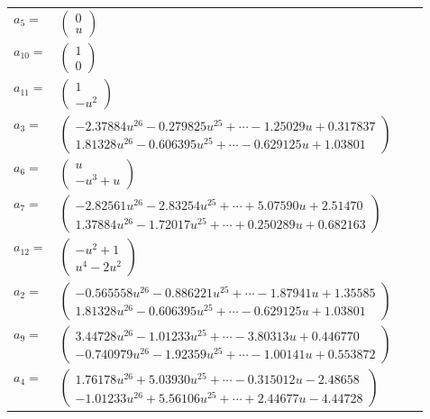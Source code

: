 \documentclass[1p]{elsarticle_modified}
\theoremstyle{definition}
\begin{document}
\begin{tabular}{m{7pt} m{180pt} m{7pt} m{180pt} }
\flushright $a_{5}=$&$\begin{pmatrix}0\\u\end{pmatrix}$ \\
\flushright $a_{10}=$&$\begin{pmatrix}1\\0\end{pmatrix}$ \\
\flushright $a_{11}=$&$\begin{pmatrix}1\\- u^2\end{pmatrix}$ \\
\flushright $a_{3}=$&$\begin{pmatrix}-2.37884 u^{26}-0.279825 u^{25}+\cdots-1.25029 u+0.317837\\1.81328 u^{26}-0.606395 u^{25}+\cdots-0.629125 u+1.03801\end{pmatrix}$ \\
\flushright $a_{6}=$&$\begin{pmatrix}u\\- u^3+u\end{pmatrix}$ \\
\flushright $a_{7}=$&$\begin{pmatrix}-2.82561 u^{26}-2.83254 u^{25}+\cdots+5.07590 u+2.51470\\1.37884 u^{26}-1.72017 u^{25}+\cdots+0.250289 u+0.682163\end{pmatrix}$ \\
\flushright $a_{12}=$&$\begin{pmatrix}- u^2+1\\u^4-2 u^2\end{pmatrix}$ \\
\flushright $a_{2}=$&$\begin{pmatrix}-0.565558 u^{26}-0.886221 u^{25}+\cdots-1.87941 u+1.35585\\1.81328 u^{26}-0.606395 u^{25}+\cdots-0.629125 u+1.03801\end{pmatrix}$ \\
\flushright $a_{9}=$&$\begin{pmatrix}3.44728 u^{26}-1.01233 u^{25}+\cdots-3.80313 u+0.446770\\-0.740979 u^{26}-1.92359 u^{25}+\cdots-1.00141 u+0.553872\end{pmatrix}$ \\
\flushright $a_{4}=$&$\begin{pmatrix}1.76178 u^{26}+5.03930 u^{25}+\cdots-0.315012 u-2.48658\\-1.01233 u^{26}+5.56106 u^{25}+\cdots+2.44677 u-4.44728\end{pmatrix}$ \\

\end{tabular}
\end{document}
